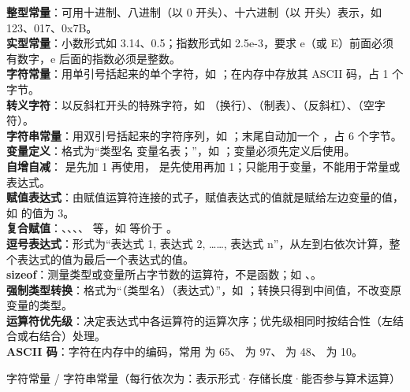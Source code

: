 \documentclass[a4paper,11pt]{article}
\begin{document}
\begin{keyterms}
\textbf{整型常量}：可用十进制、八进制（以 0 开头）、十六进制（以  开头）表示，如 123、017、0x7B。\\
\textbf{实型常量}：小数形式如 3.14、0.5；指数形式如 2.5e-3，要求 e（或 E）前面必须有数字，e 后面的指数必须是整数。\\
\textbf{字符常量}：用单引号括起来的单个字符，如 ；在内存中存放其 ASCII 码，占 1 个字节。\\
\textbf{转义字符}：以反斜杠开头的特殊字符，如 （换行）、（制表）、（反斜杠）、（空字符）。\\
\textbf{字符串常量}：用双引号括起来的字符序列，如 ；末尾自动加一个 ，占 6 个字节。\\
\textbf{变量定义}：格式为“类型名 变量名表；”，如 ；变量必须先定义后使用。\\
\textbf{自增自减}： 是先加 1 再使用， 是先使用再加 1；只能用于变量，不能用于常量或表达式。\\
\textbf{赋值表达式}：由赋值运算符连接的式子，赋值表达式的值就是赋给左边变量的值，如  的值为 3。\\
\textbf{复合赋值}：\code{+=}、\code{-=}、\code{*=}、\code{/=}、\code{\%=} 等，如  等价于 。\\
\textbf{逗号表达式}：形式为“表达式 1, 表达式 2, ……, 表达式 n”，从左到右依次计算，整个表达式的值为最后一个表达式的值。\\
\textbf{sizeof}：测量类型或变量所占字节数的运算符，不是函数；如 、。\\
\textbf{强制类型转换}：格式为“（类型名）（表达式）”，如 ；转换只得到中间值，不改变原变量的类型。\\
\textbf{运算符优先级}：决定表达式中各运算符的运算次序；优先级相同时按结合性（左结合或右结合）处理。\\
\textbf{ASCII 码}：字符在内存中的编码，常用  为 65、 为 97、 为 48、 为 10。
\end{keyterms}

\begin{contrast}{字符常量 / 字符串常量（每行依次为：表示形式·存储长度·能否参与算术运算）}
\end{contrast}
\end{document}

